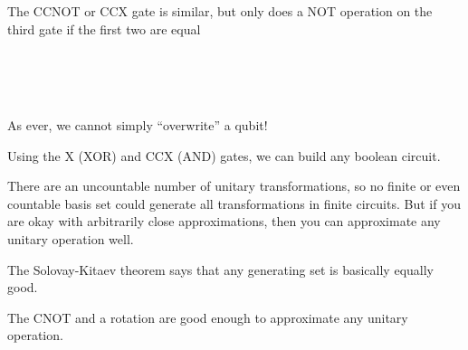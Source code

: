 \begin{remark}
  The CCNOT or CCX gate is similar, but only does a NOT operation on the
  third gate if the first two are equal

  \begin{nedqn}
     \mapsto {} \\
     \mapsto {} \\
     \mapsto {} \\
     \mapsto {}
  \end{nedqn}

  \noindent
  As ever, we cannot simply ``overwrite'' a qubit!
\end{remark}

\begin{remark}
  Using the X (XOR) and CCX (AND) gates, we can build any boolean
  circuit.

  There are an uncountable number of unitary transformations, so no
  finite or even countable basis set could generate all transformations
  in finite circuits. But if you are okay with arbitrarily close
  approximations, then you can approximate any unitary operation well.

  The Solovay-Kitaev theorem says that any generating set is basically
  equally good.

  The CNOT and a rotation are good enough to approximate any unitary
  operation.
\end{remark}
